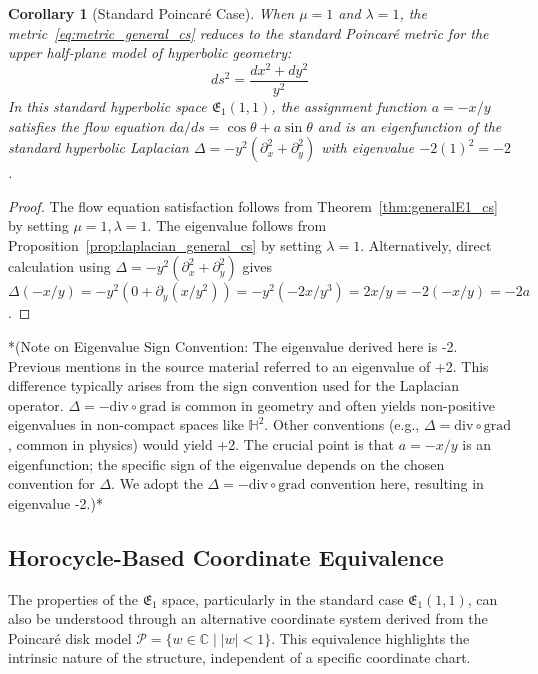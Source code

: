 \documentclass[12pt]{article}
\newtheorem{corollary}{Corollary}[section]
\begin{document}
\begin{corollary}[Standard Poincaré Case]\label{cor:laplacian_standard_cs}
When \( \mu = 1 \) and \( \lambda = 1 \), the metric~\eqref{eq:metric_general_cs} reduces to the standard Poincaré metric for the upper half-plane model of hyperbolic geometry:
\[
ds^2 = \frac{dx^2 + dy^2}{y^2}
\]
In this standard hyperbolic space \( \mathfrak{E}_1(1, 1) \), the assignment function \( a = -x/y \) satisfies the flow equation \( da/ds = \cos \theta + a \sin \theta \) and is an eigenfunction of the standard hyperbolic Laplacian \( \Delta = -y^2(\partial_x^2 + \partial_y^2) \) with eigenvalue \( -2(1)^2 = -2 \).
\end{corollary}
\begin{proof}
The flow equation satisfaction follows from Theorem~\ref{thm:generalE1_cs} by setting \( \mu=1, \lambda=1 \). The eigenvalue follows from Proposition~\ref{prop:laplacian_general_cs} by setting \( \lambda=1 \). Alternatively, direct calculation using \( \Delta = -y^2(\partial_x^2 + \partial_y^2) \) gives \( \Delta(-x/y) = -y^2(0 + \partial_y(x/y^2)) = -y^2(-2x/y^3) = 2x/y = -2(-x/y) = -2a \).
\end{proof}

*(Note on Eigenvalue Sign Convention: The eigenvalue derived here is -2. Previous mentions in the source material referred to an eigenvalue of +2. This difference typically arises from the sign convention used for the Laplacian operator. \( \Delta = -\text{div} \circ \text{grad} \) is common in geometry and often yields non-positive eigenvalues in non-compact spaces like \( \mathbb{H}^2 \). Other conventions (e.g., \( \Delta = \text{div} \circ \text{grad} \), common in physics) would yield +2. The crucial point is that \( a = -x/y \) is an eigenfunction; the specific sign of the eigenvalue depends on the chosen convention for \( \Delta \). We adopt the \( \Delta = -\text{div} \circ \text{grad} \) convention here, resulting in eigenvalue -2.)*

\subsection{Horocycle-Based Coordinate Equivalence} %

The properties of the \( \mathfrak{E}_1 \) space, particularly in the standard case \( \mathfrak{E}_1(1, 1) \), can also be understood through an alternative coordinate system derived from the Poincaré disk model \( \mathcal{P} = \{ w \in \mathbb{C} \mid |w| < 1 \} \). This equivalence highlights the intrinsic nature of the structure, independent of a specific coordinate chart.
\end{document}
